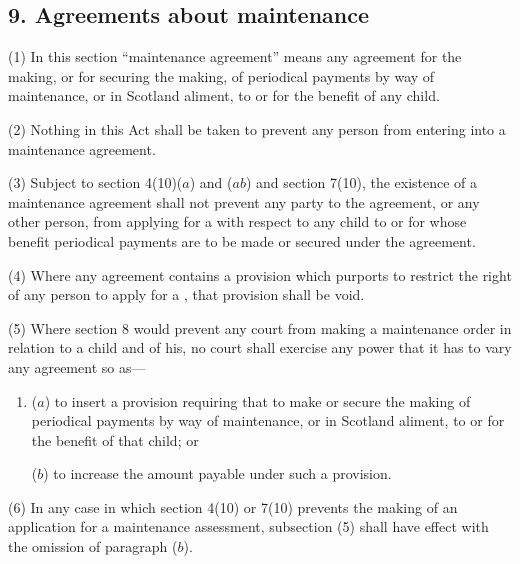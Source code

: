 \documentclass[a4paper]{article}
\begin{document}
\subsection{9. Agreements about maintenance}

(1) In
this section “maintenance agreement” means any agreement for the
making, or for securing the making, of periodical payments by way of maintenance, or in Scotland aliment, to or for the benefit of any child.

(2) Nothing in this Act shall be taken to prevent any person from entering into
a maintenance agreement.

(3) Subject to section 4(10)($a$) and ($ab$) and section 7(10), the existence of a
maintenance agreement shall not prevent any party to the agreement, or any other
person, from applying for a 
with
respect to any child to or for whose benefit periodical payments are to be made or
secured under the agreement.

(4) Where any agreement contains a provision which purports to restrict the
right of any person to apply for a ,
that provision shall be void.

(5) Where section 8 would prevent any court from making a maintenance order
in relation to a child and 
of his, no court
shall exercise any power that it has to vary any agreement so as---
\begin{enumerate}\item[]
($a$) to insert a provision requiring that 
to
make or secure the making of periodical payments by way of maintenance,
or in Scotland aliment, to or for the benefit of that child; or

($b$)
to increase the amount payable under such a provision.
\end{enumerate}

(6) In any case in which section 4(10) or 7(10) prevents the making of an
application for a maintenance assessment, subsection (5) shall have effect with
the omission of paragraph ($b$).
\end{document}
